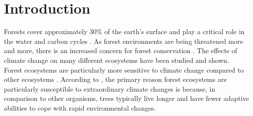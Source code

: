 \documentclass[a4paper, twoside]{templates/ociamthesis}
\begin{document}
\begin{romanpages}

\flushbottom

\tableofcontents

\listoffigures
	\mtcaddchapter

\listoftables
  \mtcaddchapter


\end{romanpages}

\flushbottom

\hypertarget{introduction}{%
\chapter{Introduction}\label{introduction}}

Forests cover approximately 30\% of the earth's surface and play a critical role in the water and carbon cycles \citep{laurent2011inversion}. As forest environments are being threatened more and more, there is an increased concern for forest conservation \citep{grammatikopoulou2021value}. The effects of climate change on many different ecosystems have been studied and shown. Forest ecosystems are particularly more sensitive to climate change compared to other ecosystems \citep{esquivel2019compositional, lindner2010climate}. According to \citet{lindner2010climate}, the primary reason forest ecosystems are particularly susceptible to extraordinary climate changes is because, in comparison to other organisms, trees typically live longer and have fewer adaptive abilities to cope with rapid environmental changes.
\end{document}
